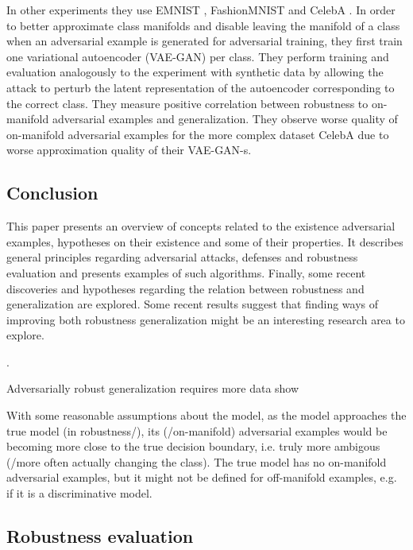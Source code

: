 \documentclass{article}
\begin{document}
In other experiments they use EMNIST \citep{Cohen:2017:EMNIST}, FashionMNIST \citep{Xiao:2017:FMNIDBMLA} and CelebA \citep{Liu:2015:DLFAW}. In order to better approximate class manifolds and disable leaving the manifold of a class when an adversarial example is generated for adversarial training, they first train one variational autoencoder (VAE-GAN) per class. They perform training and evaluation analogously to the experiment with synthetic data by allowing the attack to perturb the latent representation of the autoencoder corresponding to the correct class. They measure positive correlation between robustness to on-manifold adversarial examples and generalization. They observe worse quality of on-manifold adversarial examples for the more complex dataset CelebA due to worse approximation quality of their VAE-GAN-s.


\subsection{Conclusion}

This paper presents an overview of concepts related to the existence adversarial examples, hypotheses on their existence and some of their properties. It describes general principles regarding adversarial attacks, defenses and robustness evaluation and presents examples of such algorithms. Finally, some recent discoveries and hypotheses regarding the relation between robustness and generalization are explored. Some recent results  \citep{Stutz:2018:DARG} suggest that finding ways of improving both robustness generalization might be an interesting research area to explore.


\newpage.
\newpage

 Adversarially robust generalization requires
more data show 

With some reasonable assumptions about the model, as the model approaches the true model (in robustness/), its (/on-manifold) adversarial examples would be becoming more close to the true decision boundary, i.e. truly more ambigous (/more often actually changing the class). The true model has no on-manifold adversarial examples, but it might not be defined for off-manifold examples, e.g. if it is a discriminative model.









\newpage

\subsection{Robustness evaluation}
\end{document}
